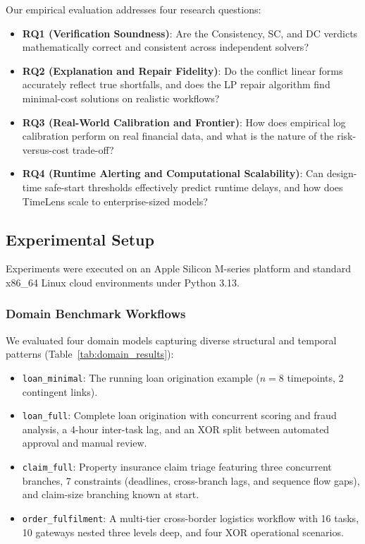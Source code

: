 \documentclass[conference]{IEEEtran}
\begin{document}
Our empirical evaluation addresses four research questions:
\begin{itemize}
    \item \textbf{RQ1 (Verification Soundness)}: Are the Consistency, SC, and DC verdicts mathematically correct and consistent across independent solvers?
    \item \textbf{RQ2 (Explanation and Repair Fidelity)}: Do the conflict linear forms accurately reflect true shortfalls, and does the LP repair algorithm find minimal-cost solutions on realistic workflows?
    \item \textbf{RQ3 (Real-World Calibration and Frontier)}: How does empirical log calibration perform on real financial data, and what is the nature of the risk-versus-cost trade-off?
    \item \textbf{RQ4 (Runtime Alerting and Computational Scalability)}: Can design-time safe-start thresholds effectively predict runtime delays, and how does TimeLens scale to enterprise-sized models?
\end{itemize}

\subsection{Experimental Setup}
Experiments were executed on an Apple Silicon M-series platform and standard x86\_64 Linux cloud environments under Python 3.13.

\subsubsection{Domain Benchmark Workflows}
We evaluated four domain models capturing diverse structural and temporal patterns (Table~\ref{tab:domain_results}):
\begin{itemize}
    \item \texttt{loan\_minimal}: The running loan origination example ($n=8$ timepoints, 2 contingent links).
    \item \texttt{loan\_full}: Complete loan origination with concurrent scoring and fraud analysis, a 4-hour inter-task lag, and an XOR split between automated approval and manual review.
    \item \texttt{claim\_full}: Property insurance claim triage featuring three concurrent branches, 7 constraints (deadlines, cross-branch lags, and sequence flow gaps), and claim-size branching known at start.
    \item \texttt{order\_fulfilment}: A multi-tier cross-border logistics workflow with 16 tasks, 10 gateways nested three levels deep, and four XOR operational scenarios.
\end{itemize}
\end{document}
